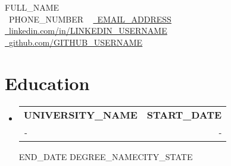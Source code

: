 \documentclass[letterpaper,11pt]{article}
\makeatletter
\newcommand{\resumeSubheading}[4]{
  \vspace{-2pt}\item
    \begin{tabular*}{1.0\textwidth}[t]{l@{\extracolsep{\fill}}r}
      \textbf{#1} & \textbf{\small #2} \\
      \textit{\small#3} & \textit{\small #4} \\
    \end{tabular*}\vspace{-7pt}
}
\newcommand{\resumeSubHeadingListStart}{\begin{itemize}[leftmargin=0.0in, label={}]}
\newcommand{\resumeSubHeadingListEnd}{\end{itemize}}
\makeatother
\begin{document}

\begin{center}
    {\Huge \scshape {{FULL_NAME}}} \\ \vspace{1pt}
    \small \raisebox{-0.1\height}\faPhone\ {{PHONE_NUMBER}} ~ 
    \href{mailto:{{EMAIL_ADDRESS}}}{\raisebox{-0.2\height}\faEnvelope\  \underline{{EMAIL_ADDRESS}}} ~ 
    \href{https://linkedin.com/in/{{LINKEDIN_USERNAME}}}{\raisebox{-0.2\height}\faLinkedin\ \underline{linkedin.com/in/{{LINKEDIN_USERNAME}}}}  ~
    \href{https://github.com/{{GITHUB_USERNAME}}}{\raisebox{-0.2\height}\faGithub\ \underline{github.com/{{GITHUB_USERNAME}}}}
    \vspace{-8pt}
\end{center}


\section{Education}
  \resumeSubHeadingListStart
    \resumeSubheading
      {{UNIVERSITY_NAME}}{{START_DATE}} -- {{END_DATE}}
      {{DEGREE_NAME}}{{CITY_STATE}}
  \resumeSubHeadingListEnd

\end{document}
